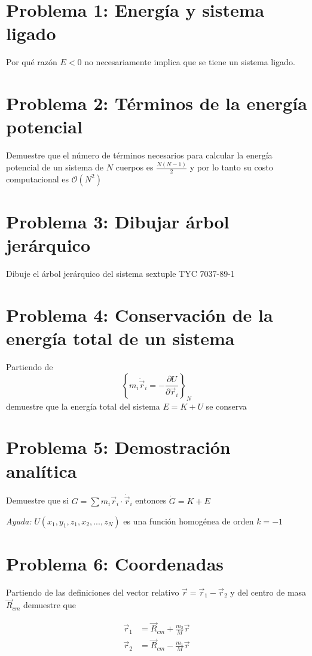 \documentclass[a4paper]{article}
\begin{document}
\section{Problema 1: Energía y sistema ligado}
Por qué razón $E<0$ no necesariamente implica que se tiene un sistema ligado.

\section{Problema 2: Términos de la energía potencial}

Demuestre que el número de términos necesarios para calcular la energía potencial de un sistema de $N$ cuerpos es $\frac{N(N-1)}{2}$ y por lo tanto su costo computacional es $\mathcal{O}(N^2)$

\section{Problema 3: Dibujar árbol jerárquico}

Dibuje el árbol jerárquico del sistema sextuple TYC 7037-89-1

\section{Problema 4: Conservación de la energía total de un sistema}

Partiendo de $$\left\{m_i \ddot{\vec{r}}_i = -\frac{\partial U}{\partial \vec{r}_i}\right\}_N$$ demuestre que la energía total del sistema $E=K+U$ se conserva

\section{Problema 5: Demostración analítica}

Demuestre que si $G = \sum m_i \vec{r}_i\cdot \dot{\vec{r}}_i$ entonces $\dot{G} = K+E$ 

\textit{Ayuda:} $U(x_1,y_1,z_1,x_2,...,z_N)$ es una función homogénea de orden $k=-1$

\section{Problema 6: Coordenadas}
Partiendo de las definiciones del vector relativo $\vec{r}=\vec{r}_1-\vec{r}_2$ y del centro de masa $\vec{R}_{cm}$ demuestre que 

\begin{align*}
\vec{r}_1 &= \vec{R}_{cm} + \frac{m_2}{M}\vec{r} \\
\vec{r}_2 &= \vec{R}_{cm} - \frac{m_1}{M}\vec{r}
\end{align*}


 
\end{document}
